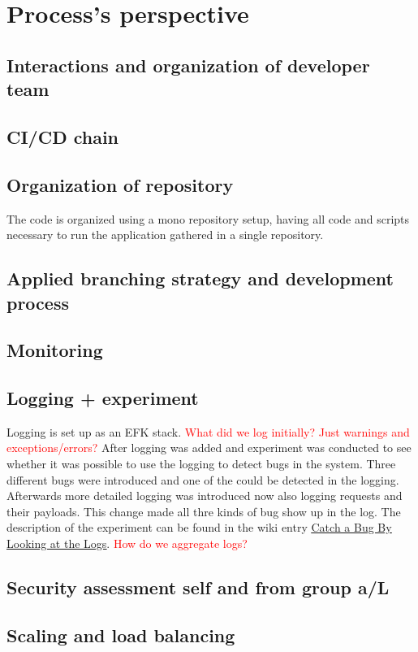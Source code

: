 \section{Process's perspective} \label{section:Process perspective}
\subsection{Interactions and organization of developer team} %

\subsection{CI/CD chain} %

\subsection{Organization of repository} %
The code is organized using a mono repository setup, having all code and scripts necessary to run the application gathered in a single repository.%

\subsection{Applied branching strategy and development process} %

\subsection{Monitoring} %

\subsection{Logging + experiment}
Logging is set up as an EFK stack. \textcolor{red}{What did we log initially? Just warnings and exceptions/errors?} After logging was added and experiment was conducted to see whether it was possible to use the logging to detect bugs in the system. Three different bugs were introduced and one of the could be detected in the logging. Afterwards more detailed logging was introduced now also logging requests and their payloads. This change made all thre kinds of bug show up in the log. The description of the experiment can be found in the wiki entry \underline{\href{https://github.com/DevOps2021-gb/devops2021/wiki/Catch-a-Bug-By-Looking-at-the-Logs}{Catch a Bug By Looking at the Logs}}.
\textcolor{red}{How do we aggregate logs?}

\subsection{Security assessment self and from group a/L} %

\subsection{Scaling and load balancing}\label{subsection:scaling} %
